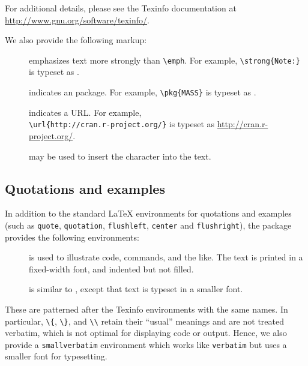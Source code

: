 For additional details, please see the Texinfo documentation
at \url{http://www.gnu.org/software/texinfo/}.

We also provide the following markup:

\begin{description}
\item[\code{$\backslash$ \\strong}]
emphasizes text more strongly than  \verb|\emph|.
For example, \verb|\strong{Note:}| is typeset as .

\item[\code{$\backslash$ \\pkg}]
indicates an \R{} package. For example,
\verb|\pkg{MASS}| is typeset as .

\item[\code{$\backslash$ \\url}] indicates a URL.
For example,\\ \verb|\url{http://cran.r-project.org/}| is typeset
as \url{http://cran.r-project.org/}.

\item[\code{$\backslash$ \\R\{\}}] may be used to
insert the character \R{} into the text.

\end{description}

\subsection{Quotations and examples}

In addition to the standard \LaTeX{} environments for quotations and examples (such
as \verb|quote|, \verb|quotation|, \verb|flushleft|, \verb|center| and \verb|flushright|), the
\pkg{\filename} package provides the following environments:

\begin{description}

\item[]
is used to illustrate code, commands, and the like.  The text is printed in a
fixed-width font, and indented but not filled.

\item[]
is similar to , except that text is typeset in a smaller
font.

\end{description}

These are patterned after the Texinfo environments with the same
names.  In particular, \verb|\{|, \verb|\}|, and \verb|\\| retain their ``usual'' meanings
and are not treated verbatim, which is not optimal for displaying \R{}
code or output.  Hence, we also provide a \verb|smallverbatim| environment
which works like \verb|verbatim| but uses a smaller font for typesetting.


